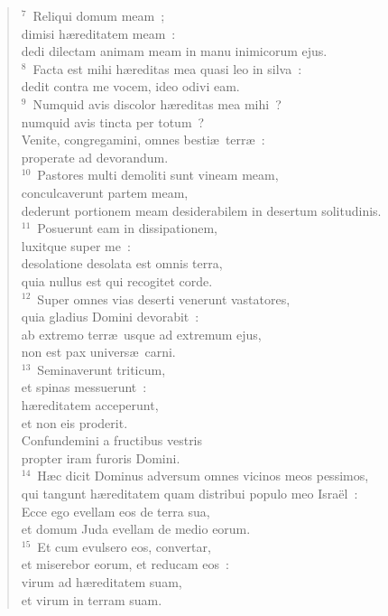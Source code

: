 \begin{flushleft}\begin{verse}${}^{7}$~Reliqui domum meam~;\\ dimisi h\ae reditatem meam~:\\ dedi dilectam animam meam in manu inimicorum ejus.\\
${}^{8}$~Facta est mihi h\ae reditas mea quasi leo in silva~:\\ dedit contra me vocem, ideo odivi eam.\\
${}^{9}$~Numquid avis discolor h\ae reditas mea mihi~?\\ numquid avis tincta per totum~?\\ Venite, congregamini, omnes besti\ae\ terr\ae~:\\ properate ad devorandum.\\
${}^{10}$~Pastores multi demoliti sunt vineam meam,\\ conculcaverunt partem meam,\\ dederunt portionem meam desiderabilem in desertum solitudinis.\\
${}^{11}$~Posuerunt eam in dissipationem,\\ luxitque super me~:\\ desolatione desolata est omnis terra,\\ quia nullus est qui recogitet corde.\\
${}^{12}$~Super omnes vias deserti venerunt vastatores,\\ quia gladius Domini devorabit~:\\ ab extremo terr\ae\ usque ad extremum ejus,\\ non est pax univers\ae\ carni.\\
${}^{13}$~Seminaverunt triticum,\\ et spinas messuerunt~:\\ h\ae reditatem acceperunt,\\ et non eis proderit.\\ Confundemini a fructibus vestris\\ propter iram furoris Domini.\\
${}^{14}$~H\ae c dicit Dominus adversum omnes vicinos meos pessimos,\\ qui tangunt h\ae reditatem quam distribui populo meo Isra\"el~:\\ Ecce ego evellam eos de terra sua,\\ et domum Juda evellam de medio eorum.\\
${}^{15}$~Et cum evulsero eos, convertar,\\ et miserebor eorum, et reducam eos~:\\ virum ad h\ae reditatem suam,\\ et virum in terram suam.\\

\end{verse}
\end{flushleft}

